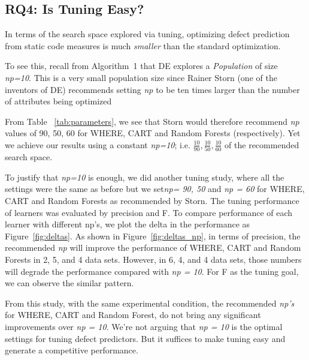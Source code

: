 \documentclass{sig-alternative}
\newcommand{\fig}[1]{Figure~\ref{fig:#1}}
\newcommand{\tab}[1]{Table ~\ref{tab:#1}}
\begin{document}

 
\subsection{RQ4: Is Tuning Easy?}\label{sect:easy}

In terms of the search space
explored via tuning, optimizing defect prediction from static code
measures is much {\em smaller} than the standard optimization.

To see this,
recall from Algorithm~1 that
DE explores a {\em Population} of size {\em np=10}. This is a very small population size since
Rainer Storn (one of the inventors of DE) recommends  setting {\em np} to be ten times larger than the number
of attributes being optimized~

From \tab{parameters},
we see that Storn would therefore recommend {\em np} values of
90, 50, 60 for WHERE, CART and Random Forests (respectively). Yet we achieve our results
using a constant {\em np=10}; i.e. $\frac{10}{90}, \frac{10}{50}, \frac{10}{60}$ of the
recommended search space.

To justify that {\em np=10} is enough, we did another tuning study, 
where all the settings were the same as before but we set{\em np= 90, 50} and {\em np = 60} for WHERE, CART and Random Forests as recommended by Storn. The tuning performance of learners was evaluated
by precision and F. To compare performance of each learner with different np's, we plot the delta in the performance as \fig{deltas}. As shown in \fig{deltas_np}, in terms of precision, the recommended {\em np} will improve the performance of WHERE, CART and Random Forests in 2, 5, and 4 data sets. However, in 6, 4, and 4 data sets, those numbers  will degrade the performance compared with {\em np = 10}. For F as the tuning goal, we can observe the similar pattern. 

 From this study, with the same experimental condition, the recommended {\em np's} for WHERE, CART and Random Forest, do not bring any significant improvements over {\em np = 10}. We're not arguing that {\em np = 10} is the optimal settings for tuning defect predictors. But it suffices to make tuning easy and generate a competitive performance.
\end{document}
